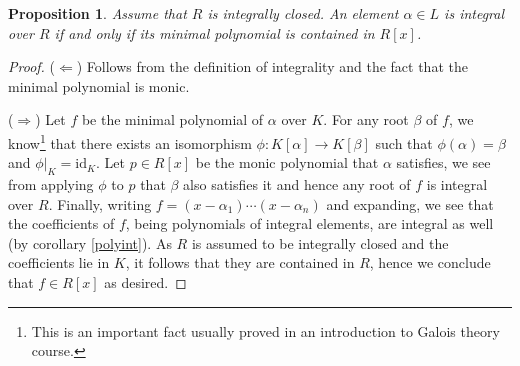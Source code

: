 \documentclass{tufte-handout} %
\newtheorem{prop}[thm]{Proposition}
\theoremstyle{definition}
\theoremstyle{remark}
\begin{document}
\begin{prop}\label{minpolyint}
	Assume that $R$ is integrally closed. An element $\alpha \in L$ is integral over $R$ if and only if its minimal polynomial is contained in $R[x]$.
\end{prop}
\begin{proof}
	($\Leftarrow$) Follows from the definition of integrality and the fact that the minimal polynomial is monic.
	
	($\Rightarrow$) Let $f$ be the minimal polynomial of $\alpha$ over $K$. For any root $\beta$ of $f$, we know\footnote{This is an important fact usually proved in an introduction to Galois theory course.} that there exists an isomorphism $\phi: K[\alpha] \rightarrow K[\beta]$ such that $\phi(\alpha) = \beta$ and $\phi|_K = \text{id}_K$. Let $p \in R[x]$ be the monic polynomial that $\alpha$ satisfies, we see from applying $\phi$ to $p$ that $\beta$ also satisfies it and hence any root of $f$ is integral over $R$. Finally, writing $f = (x-\alpha_1)\cdots (x-\alpha_n)$ and expanding, we see that the coefficients of $f$, being polynomials of integral elements, are integral as well (by corollary \ref{polyint}). As $R$ is assumed to be integrally closed and the coefficients lie in $K$, it follows that they are contained in $R$, hence we conclude that $f \in R[x]$ as desired.
\end{proof}
\end{document}
